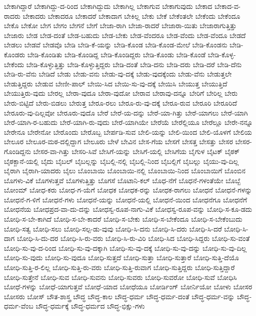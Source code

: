 {ಬೇಕಾಗಿದ್ದಾರೆ
ಬೇಕಾಗಿದ್ದು-ದ-ರಿಂದ
ಬೇಕಾಗಿದ್ದುದು
ಬೇಕಾಗಿಲ್ಲ
ಬೇಕಾಗುವ
ಬೇಕಾಗುವುದು
ಬೇಕಾದ
ಬೇಕಾದ-ವ-ರಾದರು
ಬೇಕಾದರು
ಬೇಕಾದರೂ
ಬೇಕಾದರೆ
ಬೇಕಾದಾಗ
ಬೇಕಿಲ್ಲ
ಬೇಕು
ಬೇಕೆ
ಬೇಕೆಂತಲೇ
ಬೇಕೆಂದು
ಬೇಕೆಂದೂ
ಬೇಕೊ
ಬೇಕೋ
ಬೇಗ
ಬೇಗಂ
ಬೇಗನೆ
ಬೇಗೆ
ಬೇಜಾ-ರಾಗಿ
ಬೇಜಾ-ರಾದರೆ
ಬೇಜಾರಾ-ಯಿತು
ಬೇಜಾರಾಗುತ್ತಿತ್ತು
ಬೇಜಾರು
ಬೇಡ
ಬೇಡ-ದಂತೆ
ಬೇಡ-ಬಹುದು
ಬೇಡ-ಬೇಕು
ಬೇಡ-ವೆಂದರೂ
ಬೇಡ-ವೆಂದು
ಬೇಡ-ವೆಂದೂ
ಬೇಡದೆ
ಬೇಡಲು
ಬೇಡವೆ
ಬೇಡವೊ
ಬೇಡಿ
ಬೇಡಿ-ಕೆ-ಯನ್ನು
ಬೇಡಿ-ಕೊಂಡ
ಬೇಡಿ-ಕೊಂಡ-ಮೇಲೆ
ಬೇಡಿ-ಕೊಂಡನು
ಬೇಡಿ-ಕೊಂಡರು
ಬೇಡಿ-ಕೊಂಡಿತು
ಬೇಡಿ-ಕೊಂಡಿದ್ದ
ಬೇಡಿ-ಕೊಂಡಿದ್ದರು
ಬೇಡಿ-ಕೊಂಡು
ಬೇಡಿ-ಕೊಂಡೆ
ಬೇಡಿ-ಕೊಳ್ಳ-ಬೇಕೆಂದು
ಬೇಡಿ-ಕೊಳ್ಳುತ್ತಿತ್ತು
ಬೇಡಿ-ಕೊಳ್ಳುತ್ತಿದ್ದರು
ಬೇಡಿ-ದಂತೆ
ಬೇಡಿ-ದನು
ಬೇಡಿ-ದರು
ಬೇಡಿ-ದರೆ
ಬೇಡಿ-ದೆನು
ಬೇಡಿ-ರು-ವೆನು
ಬೇಡಿದೆ
ಬೇಡು
ಬೇಡು-ವನು
ಬೇಡು-ವು-ದಕ್ಕೆ
ಬೇಡು-ವುದಕ್ಕೆಂದು
ಬೇಡು-ವೆನು
ಬೇಡುತ್ತಲೇ
ಬೇಡುತ್ತಿದ್ದರು
ಬೇಡುವ
ಬೇಣೀ-ಪಾಲ್
ಬೇಯಿ-ಸಿದ
ಬೇಯಿ-ಸು-ವು-ದಕ್ಕೆ
ಬೇಯಿಸಿ
ಬೇಯುತ್ತ
ಬೇಯುತ್ತಿದೆ
ಬೇಯುತ್ತಿರು-ವುದು
ಬೇರಲ್ಲ
ಬೇರಾ-ವುದೂ
ಬೇರಾ-ವುದೋ
ಬೇರಾವ
ಬೇರಾವು-ದನ್ನೂ
ಬೇರಿಗೆ
ಬೇರಿಲ್ಲ
ಬೇರು
ಬೇರು-ಬಿಟ್ಟಿದೆ
ಬೇರು-ಬಿಡಲು
ಬೇರುತ್ತ
ಬೇರೂ-ರಲು
ಬೇರೂ-ರು-ವು-ದಕ್ಕೆ
ಬೇರೂ-ರುವ
ಬೇರೂರಿ
ಬೇರೂರಿದೆ
ಬೇರೂರು-ವು-ದಿಲ್ಲವೋ
ಬೇರೂರು-ವುದೊ
ಬೇರೆ
ಬೇರೆ-ಯ-ದನ್ನು
ಬೇರೆ-ಯಾ-ಗಿತ್ತು
ಬೇರೆ-ಯಾಗಲು
ಬೇರೆ-ಯಾಗಿ
ಬೇರೆ-ಯಾಗಿ-ರ-ಬಹುದು
ಬೇರೆ-ಯಾಗಿ-ರು-ವುದು
ಬೇರೆ-ಯಾಗಿಯೇ
ಬೇರೆಯೆ
ಬೇರೆಲ್ಲಿಯೂ
ಬೇರೆಲ್ಲೂ
ಬೇರೇ-ನನ್ನೂ
ಬೇರೇನೂ
ಬೇರೇನೋ
ಬೇರೊಂದು
ಬೇರೊಬ್ಬ
ಬೇರ್ಪಡಿ-ಸುವ
ಬೇಲಿ-ಯನ್ನು
ಬೇಲಿ-ಯಿಂದ
ಬೇಲಿ-ಯೊಳಗೆ
ಬೇಲಿಯ
ಬೇಲೂರ
ಬೇಲೂರ-ಮಠ-ದಲ್ಲಿದ್ದಾಗ
ಬೇಲೂರು
ಬೇಳೆ
ಬೇವಿನ
ಬೇಸ-ಗೆಯ
ಬೇಸಗೆ
ಬೇಸತ್ತ
ಬೇಸತ್ತು
ಬೇಸರ
ಬೇಸರ-ಗೊಂಡಿದ್ದನು
ಬೇಸರ-ವಾ-ಗಿತ್ತು
ಬೇಸರಿ-ಸಿವೆ
ಬೇಸಿಗೆ-ಯನ್ನು
ಬೇಸಿಗೆ-ಯಲ್ಲಿ
ಬೇಸಿಗೆಯ
ಬೈಗುಳ
ಬೈಟಕ್
ಬೈಠಕ್
ಬೈಠಕ್ಖಾನೆ-ಯಲ್ಲಿ
ಬೈದು
ಬೈಬಲ್
ಬೈಬಲ್ಲನ್ನು
ಬೈಬಲ್ಲಿ-ನಲ್ಲಿ
ಬೈಬಲ್ಲಿ-ನಿಂದ
ಬೈಬಲ್ಲಿಗೆ
ಬೈಬಲ್ಲು
ಬೈಯು-ವು-ದಿಲ್ಲ
ಬೈರಾಗಿ
ಬೈರಾಗಿ-ಯಾದರು
ಬೈಲು
ಬೊಂಬಾಯಿ
ಬೊಂಬಾಯಿ-ನಲ್ಲಿ
ಬೊಂಬಾಯಿ-ನಿಂದ
ಬೊಂಬಾಯಿಗೆ
ಬೊಂಬಿನ
ಬೊಗಳು-ವಿಕೆ
ಬೊಗಳುತ್ತವೆ
ಬೊಗಳುತ್ತಿತ್ತು
ಬೊಗಸೆ
ಬೊಟಾನಿ-ಕಲ್
ಬೊಧ-ನೆಗೆ
ಬೊಧನೆ-ಗಳಂತೆಯೇ
ಬೊಬ್ಬೆ
ಬೋಂಮ್
ಬೋಧ-ಕರು
ಬೋಧ-ಗ-ಯೆಗೆ
ಬೋಧಕ
ಬೋಧಕ-ರನ್ನು
ಬೋಧಕ-ರಾಗಲು
ಬೋಧನೆ
ಬೋಧನೆ-ಗಳನ್ನು
ಬೋಧನೆ-ಗ-ಳಿಗೆ
ಬೋಧನೆ-ಗಳು
ಬೋಧನೆ-ಯನ್ನು
ಬೋಧನೆ-ಯಲ್ಲಿ
ಬೋಧನೆ-ಯಿಂದ
ಬೋಧನೆಗೂ
ಬೋಧನೆಗೆ
ಬೋಧನೆಯ
ಬೋಧಪ್ರದ-ವಾ-ದು-ದನ್ನು
ಬೋಧಸ್ವ-ರೂಪ-ನಾಗು-ವಿಕೆ
ಬೋಧಸ್ವ-ರೂಪ-ವನ್ನು
ಬೋಧಿ-ಸ-ಕೂ-ಡದು
ಬೋಧಿ-ಸ-ಬೇ-ಕಾಗಿದೆ
ಬೋಧಿ-ಸ-ಬೇ-ಕಾದರೆ
ಬೋಧಿ-ಸ-ಬೇಕು
ಬೋಧಿ-ಸ-ಬೇಕೆಂದೂ
ಬೋಧಿ-ಸ-ಬೇಕೆಂಬುದು
ಬೋಧಿ-ಸತ್ವ
ಬೋಧಿ-ಸಲು
ಬೋಧಿ-ಸಲ್ಪ-ಡು-ವುವು
ಬೋಧಿ-ಸಿ-ದನು
ಬೋಧಿ-ಸಿ-ದರು
ಬೋಧಿ-ಸಿ-ದರೆ
ಬೋಧಿ-ಸಿ-ದಾಗ
ಬೋಧಿ-ಸಿ-ದು-ದರ
ಬೋಧಿ-ಸಿ-ರು-ವರು
ಬೋಧಿ-ಸಿ-ರು-ವಿರಿ
ಬೋಧಿ-ಸಿದ
ಬೋಧಿ-ಸಿದ್ದರು
ಬೋಧಿ-ಸು-ವಂತೆ
ಬೋಧಿ-ಸು-ವು-ದ-ರಿಂದ
ಬೋಧಿ-ಸು-ವು-ದಕ್ಕಾಗಿ
ಬೋಧಿ-ಸು-ವು-ದಕ್ಕೆ
ಬೋಧಿ-ಸು-ವು-ದನ್ನು
ಬೋಧಿ-ಸು-ವು-ದಿಲ್ಲ
ಬೋಧಿ-ಸು-ವುದು
ಬೋಧಿ-ಸು-ವುದೂ
ಬೋಧಿ-ಸುತ್ತದೆ
ಬೋಧಿ-ಸುತ್ತಾ
ಬೋಧಿ-ಸುತ್ತಾರೆ
ಬೋಧಿ-ಸುತ್ತಿ-ದೆಯೊ
ಬೋಧಿ-ಸುತ್ತಿ-ರ-ಲಿಲ್ಲ
ಬೋಧಿ-ಸುತ್ತಿ-ರು-ವರು
ಬೋಧಿ-ಸುತ್ತಿ-ರುವಾಗ
ಬೋಧಿ-ಸುತ್ತಿದ್ದರು
ಬೋಧಿ-ಸುತ್ತಿದ್ದಾರೆ
ಬೋಧಿ-ಸುತ್ತೇನೆ
ಬೋಧಿ-ಸುವ
ಬೋಧಿ-ಸುವನು
ಬೋಧಿ-ಸುವರು
ಬೋಧಿ-ಸುವರೋ
ಬೋಧಿ-ಸುವೆ
ಬೋಧಿಸಿ
ಬೋಧೆ-ಗಳನ್ನು
ಬೋಧೆ-ಯಾಗುತ್ತವೆ
ಬೋಧೆ-ಯಾದ
ಬೋಧೆಯೂ
ಬೋರ್ಡಿಂಗ್
ಬೋರ್ನಿಯೋ
ಬೋಳು
ಬೋಸರ
ಬೋಸರು
ಬೋಸ್
ಬೌತ-ಶಾಸ್ತ್ರ
ಬೌದ್ಧ
ಬೌದ್ಧ-ಕಾಲ
ಬೌದ್ಧ-ಧರ್ಮ
ಬೌದ್ಧ-ಧರ್ಮ-ದಂತೆ
ಬೌದ್ಧ-ಧರ್ಮ-ವನ್ನು
ಬೌದ್ಧ-ಧರ್ಮ-ವೆಂಬ
ಬೌದ್ಧ-ಧರ್ಮಕ್ಕೆ
ಬೌದ್ಧ-ಧರ್ಮದ
ಬೌದ್ಧ-ಭಿಕ್ಷು-ಗಳು
}
